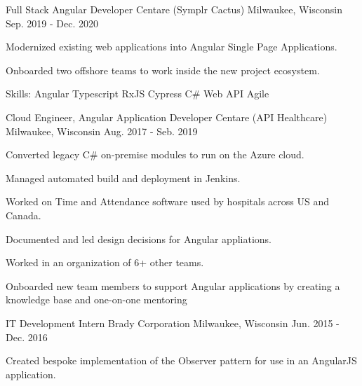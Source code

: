\begin{cventries}
  \cventry
    {Full Stack Angular Developer} %
    {Centare (Symplr Cactus)} %
    {Milwaukee, Wisconsin} %
    {Sep. 2019 - Dec. 2020} %
    {
      \begin{cvitems} %
        \item {Modernized existing web applications into Angular Single Page Applications.}
        \item {Onboarded two offshore teams to work inside the new project ecosystem.}
        \item {Skills: Angular \textbullet{} Typescript \textbullet{} RxJS \textbullet{} Cypress \textbullet{} C\# Web API \textbullet{} Agile}
      \end{cvitems}
    }

  \cventry
    {Cloud Engineer, Angular Application Developer} %
    {Centare (API Healthcare)} %
    {Milwaukee, Wisconsin} %
    {Aug. 2017 - Seb. 2019} %
    {
      \begin{cvitems} %
        \item {Converted legacy C\# on-premise modules to run on the Azure cloud.}
        \item {Managed automated build and deployment in Jenkins.}
        \item {Worked on Time and Attendance software used by hospitals across US and Canada.}
        \item {Documented and led design decisions for Angular appliations.}
        \item {Worked in an organization of 6+ other teams.}
        \item {Onboarded new team members to support Angular applications by creating a knowledge base and one-on-one mentoring}
      \end{cvitems}
    }

  \cventry
    {IT Development Intern} %
    {Brady Corporation} %
    {Milwaukee, Wisconsin} %
    {Jun. 2015 - Dec. 2016} %
    {
      \begin{cvitems} %
        \item {Created bespoke implementation of the Observer pattern for use in an AngularJS application.}
      \end{cvitems}
    }

\end{cventries}
